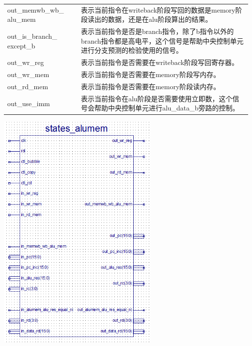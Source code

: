 \begin{center}
\begin{longtable}{p{}p{}}
        out\_memwb\_wb\_  alu\_mem &  表示当前指令在writeback阶段写回的数据是memory阶段读出的数据，还是在alu阶段算出的结果。\\
        out\_is\_branch\_  except\_b &  表示当前指令是否是branch指令，除了b指令以外的branch指令都是高电平，这个信号是帮助中央控制单元进行分支预测的检验使用的信号。\\
        out\_wr\_reg &  表示当前指令是否需要在writeback阶段写回寄存器。\\
        out\_wr\_mem &  表示当前指令是否需要在memory阶段写内存。\\
        out\_rd\_mem &  表示当前指令是否需要在memory阶段读内存。\\
        out\_use\_imm & 表示当前指令在alu阶段是否需要使用立即数，这个信号会帮助中央控制单元进行alu\_data\_b旁路的控制。 \\
        \bottomrule
    \end{longtable}
\end{center}

\begin{center}
    \includegraphics[width=8cm]{image/detail/detail_alumem.png}
    \label{fig:alumem}
\end{center}

